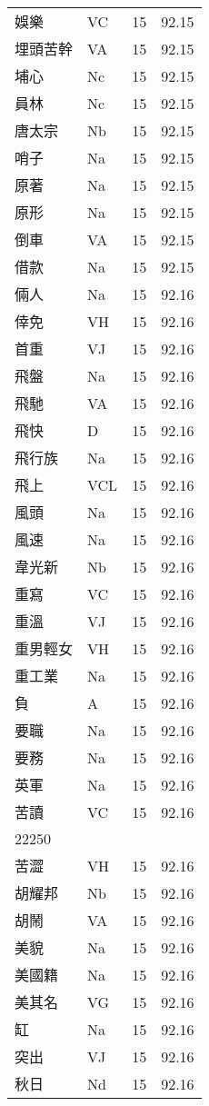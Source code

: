 \documentclass[twocolumn]{book}
\begin{document}
\begin{supertabular}{llrr}
娛樂 & VC & 15 &  92.15\\
埋頭苦幹 & VA & 15 &  92.15\\
埔心 & Nc & 15 &  92.15\\
員林 & Nc & 15 &  92.15\\
唐太宗 & Nb & 15 &  92.15\\
哨子 & Na & 15 &  92.15\\
原著 & Na & 15 &  92.15\\
原形 & Na & 15 &  92.15\\
倒車 & VA & 15 &  92.15\\
借款 & Na & 15 &  92.15\\
倆人 & Na & 15 &  92.16\\
倖免 & VH & 15 &  92.16\\
首重 & VJ & 15 &  92.16\\
飛盤 & Na & 15 &  92.16\\
飛馳 & VA & 15 &  92.16\\
飛快 & D & 15 &  92.16\\
飛行族 & Na & 15 &  92.16\\
飛上 & VCL & 15 &  92.16\\
風頭 & Na & 15 &  92.16\\
風速 & Na & 15 &  92.16\\
韋光新 & Nb & 15 &  92.16\\
重寫 & VC & 15 &  92.16\\
重溫 & VJ & 15 &  92.16\\
重男輕女 & VH & 15 &  92.16\\
重工業 & Na & 15 &  92.16\\
負 & A & 15 &  92.16\\
要職 & Na & 15 &  92.16\\
要務 & Na & 15 &  92.16\\
英軍 & Na & 15 &  92.16\\
苦讀 & VC & 15 &  92.16\\
22250\\
苦澀 & VH & 15 &  92.16\\
胡耀邦 & Nb & 15 &  92.16\\
胡鬧 & VA & 15 &  92.16\\
美貌 & Na & 15 &  92.16\\
美國籍 & Na & 15 &  92.16\\
美其名 & VG & 15 &  92.16\\
缸 & Na & 15 &  92.16\\
突出 & VJ & 15 &  92.16\\
秋日 & Nd & 15 &  92.16\\

\end{supertabular}
\end{document}
